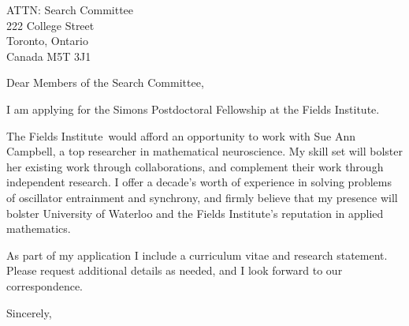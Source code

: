 \documentclass[11pt,a4paper]{letter}
\begin{document}

\def\School{Fields Institute}

\begin{letter}
{ATTN: Search Committee\\
222 College Street\\
Toronto, Ontario\\
Canada M5T 3J1
}


\opening{Dear Members of the Search Committee,}

I am applying for the Simons Postdoctoral Fellowship at the \School. 



The \School~would afford an opportunity to work with Sue Ann Campbell, a top researcher in mathematical neuroscience. My skill set will bolster her existing work through collaborations, and complement their work through independent research. I offer a decade's worth of experience in solving problems of oscillator entrainment and synchrony, and firmly believe that my presence will bolster University of Waterloo and the \School's  reputation in applied mathematics.

As part of my application I include a curriculum vitae and research statement. Please request additional details as needed, and I look forward to our correspondence.

\closing{Sincerely,}
\end{letter}
\end{document}
